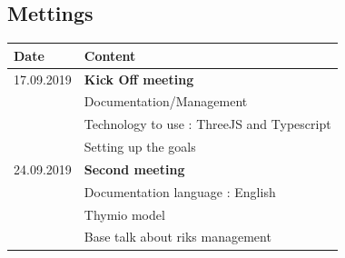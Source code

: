 \documentclass{scrartcl}
\begin{document}
\subsection{Mettings}
\begin{tabular}{ | m{3cm} | m{10cm} | }
  \hline
  Date & Content \\
  \hline
  17.09.2019 & \textbf{Kick Off meeting}\\
  & Documentation/Management\\
  & Technology to use : ThreeJS and Typescript\\
  & Setting up the goals\\
  \hline
  24.09.2019 & \textbf{Second meeting} \\
  & Documentation language : English \\
  & Thymio model \\
  & Base talk about riks management \\
  \hline
\end{tabular}

\listoffigures

\listoftables


\printbibliography[heading=bibintoc]
\end{document}
